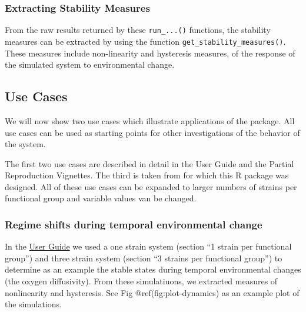 \documentclass[]{elsarticle} %
\begin{document}
\hypertarget{extracting-stability-measures}{%
\subsubsection{Extracting Stability
Measures}\label{extracting-stability-measures}}

From the raw results returned by these \texttt{run\_...()} functions,
the stability measures can be extracted by using the function
\texttt{get\_stability\_measures()}. These measures include
non-linearity and hysteresis measures, of the response of the simulated
system to environmental change.

\hypertarget{use-cases}{%
\subsection{Use Cases}\label{use-cases}}

We will now show two use cases which illustrate applications of the
package. All use cases can be used as starting points for other
investigations of the behavior of the system.

The first two use cases are described in detail in the User Guide and
the Partial Reproduction Vignettes. The third is taken from
\citet{REF_NEEDED} for which this R package was designed. All of these
use cases can be expanded to larger numbers of strains per functional
group and variable values van be changed.

\hypertarget{regime-shifts-during-temporal-environmental-change}{%
\subsubsection{Regime shifts during temporal environmental
change}\label{regime-shifts-during-temporal-environmental-change}}

In the \href{LINK_NEEDED}{User Guide} we used a one strain system
(section ``1 strain per functional group'') and three strain system
(section ``3 strains per functional group'') to determine as an example
the stable states during temporal environmental changes (the oxygen
diffusivity). From these simulatiuons, we extracted measures of
nonlinearity and hysteresis. See Fig @ref(fig:plot-dynamics) as an
example plot of the simulations.
\end{document}
